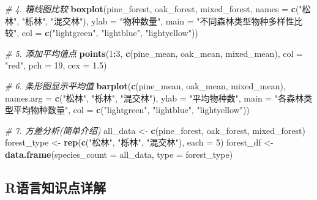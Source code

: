 \documentclass[
]{book}
\newenvironment{Shaded}{\begin{snugshade}}{\end{snugshade}}
\newcommand{\AttributeTok}[1]{\textcolor[rgb]{0.13,0.29,0.53}{#1}}
\newcommand{\CommentTok}[1]{\textcolor[rgb]{0.56,0.35,0.01}{\textit{#1}}}
\newcommand{\DecValTok}[1]{\textcolor[rgb]{0.00,0.00,0.81}{#1}}
\newcommand{\FloatTok}[1]{\textcolor[rgb]{0.00,0.00,0.81}{#1}}
\newcommand{\FunctionTok}[1]{\textcolor[rgb]{0.13,0.29,0.53}{\textbf{#1}}}
\newcommand{\NormalTok}[1]{#1}
\newcommand{\OtherTok}[1]{\textcolor[rgb]{0.56,0.35,0.01}{#1}}
\newcommand{\SpecialCharTok}[1]{\textcolor[rgb]{0.81,0.36,0.00}{\textbf{#1}}}
\newcommand{\StringTok}[1]{\textcolor[rgb]{0.31,0.60,0.02}{#1}}
\begin{document}
\begin{Shaded}
\begin{Highlighting}[]
\CommentTok{\# 4. 箱线图比较}
\FunctionTok{boxplot}\NormalTok{(pine\_forest, oak\_forest, mixed\_forest,}
        \AttributeTok{names =} \FunctionTok{c}\NormalTok{(}\StringTok{"松林"}\NormalTok{, }\StringTok{"栎林"}\NormalTok{, }\StringTok{"混交林"}\NormalTok{),}
        \AttributeTok{ylab =} \StringTok{"物种数量"}\NormalTok{, }
        \AttributeTok{main =} \StringTok{"不同森林类型物种多样性比较"}\NormalTok{,}
        \AttributeTok{col =} \FunctionTok{c}\NormalTok{(}\StringTok{"lightgreen"}\NormalTok{, }\StringTok{"lightblue"}\NormalTok{, }\StringTok{"lightyellow"}\NormalTok{))}

\CommentTok{\# 5. 添加平均值点}
\FunctionTok{points}\NormalTok{(}\DecValTok{1}\SpecialCharTok{:}\DecValTok{3}\NormalTok{, }\FunctionTok{c}\NormalTok{(pine\_mean, oak\_mean, mixed\_mean), }
       \AttributeTok{col =} \StringTok{"red"}\NormalTok{, }\AttributeTok{pch =} \DecValTok{19}\NormalTok{, }\AttributeTok{cex =} \FloatTok{1.5}\NormalTok{)}

\CommentTok{\# 6. 条形图显示平均值}
\FunctionTok{barplot}\NormalTok{(}\FunctionTok{c}\NormalTok{(pine\_mean, oak\_mean, mixed\_mean),}
        \AttributeTok{names.arg =} \FunctionTok{c}\NormalTok{(}\StringTok{"松林"}\NormalTok{, }\StringTok{"栎林"}\NormalTok{, }\StringTok{"混交林"}\NormalTok{),}
        \AttributeTok{ylab =} \StringTok{"平均物种数"}\NormalTok{,}
        \AttributeTok{main =} \StringTok{"各森林类型平均物种数量"}\NormalTok{,}
        \AttributeTok{col =} \FunctionTok{c}\NormalTok{(}\StringTok{"lightgreen"}\NormalTok{, }\StringTok{"lightblue"}\NormalTok{, }\StringTok{"lightyellow"}\NormalTok{))}

\CommentTok{\# 7. 方差分析(简单介绍)}
\NormalTok{all\_data }\OtherTok{\textless{}{-}} \FunctionTok{c}\NormalTok{(pine\_forest, oak\_forest, mixed\_forest)}
\NormalTok{forest\_type }\OtherTok{\textless{}{-}} \FunctionTok{rep}\NormalTok{(}\FunctionTok{c}\NormalTok{(}\StringTok{"松林"}\NormalTok{, }\StringTok{"栎林"}\NormalTok{, }\StringTok{"混交林"}\NormalTok{), }\AttributeTok{each =} \DecValTok{5}\NormalTok{)}
\NormalTok{forest\_df }\OtherTok{\textless{}{-}} \FunctionTok{data.frame}\NormalTok{(}\AttributeTok{species\_count =}\NormalTok{ all\_data, }\AttributeTok{type =}\NormalTok{ forest\_type)}
\end{Highlighting}
\end{Shaded}

\hypertarget{rux8bedux8a00ux77e5ux8bc6ux70b9ux8be6ux89e3-6}{%
\subsection{R语言知识点详解}\label{rux8bedux8a00ux77e5ux8bc6ux70b9ux8be6ux89e3-6}}
\end{document}
